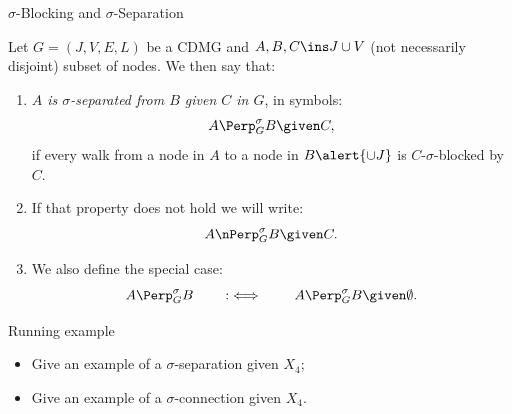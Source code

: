 \begin{frame}{$\sigma$-Blocking and $\sigma$-Separation}
\begin{Def}[\ref{def:sigma_separation}]
    Let $G=(J,V,E,L)$ be a CDMG and $A,B,C \ins J \cup V$ (not necessarily disjoint) subset of nodes.
    We then say that:
    \begin{enumerate}
        \item \emph{$A$ is $\sigma$-separated from $B$ given $C$ in $G$}, in symbols:
    \[ A \Perp^\sigma_G B \given C, \]
      if every walk from a node in $A$ to a node in $B \alert{\cup J}$ is $C$-$\sigma$-blocked by $C$.
        \item If that property does not hold we will write:
            \[ A \nPerp^\sigma_G B \given C. \]
        \item We also define the special case:
                \[ A \Perp^\sigma_G B \qquad :\iff \qquad A \Perp^\sigma_GB \given \emptyset.\]
    \end{enumerate}
\end{Def}
\end{frame}

\begin{frame}{Running example}
  \begin{Eg}
  \centering
  \begin{itemize}
    \item Give an example of a $\sigma$-separation given $X_4$;
    \item Give an example of a $\sigma$-connection given $X_4$.
  \end{itemize}
  \end{Eg}
\end{frame}

